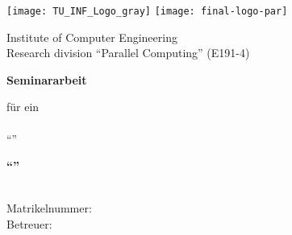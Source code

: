 
\pagestyle{empty}

\begin{titlepage}
\begin{center}
\texttt{[image: TU\_INF\_Logo\_gray]}
\hfill
\texttt{[image: final-logo-par]}

\end{center}

\vspace*{1cm}

\begin{center}

\begin{Large}
Institute of Computer Engineering \\
Research division ``Parallel Computing'' (E191-4)
\end{Large}

\vspace*{1cm}

\begin{Huge}
\textbf{Seminararbeit}\\
\end{Huge}

\vspace*{1cm}

\begin{Large}
für ein \\
\sptopic{} \\
``\seminarname{}'' 
\end{Large}


\vspace*{2cm}

\begin{Large}
\textbf{``\seminartitle{}''}
\end{Large}

\vspace*{2cm}

\begin{Large}
\studname \\
Matrikelnummer: \studmatrikel\\[2cm]

Betreuer: \spbetreuer

\vspace*{2cm}
\spdate \\

\end{Large}
\end{center}

\end{titlepage}
